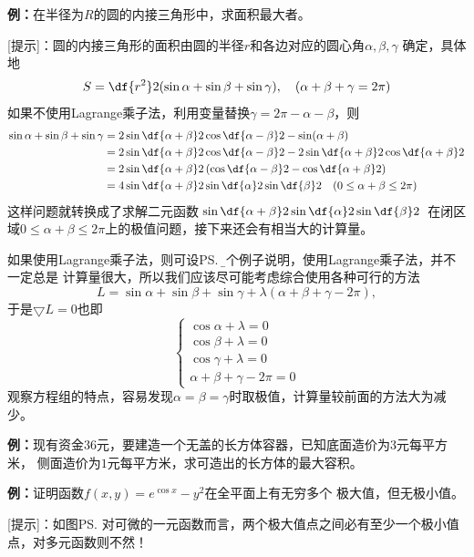 {\bf 例：}在半径为$R$的圆的内接三角形中，求面积最大者。

[提示]：圆的内接三角形的面积由圆的半径$r$和各边对应的圆心角$\alpha,\beta,\gamma$
确定，具体地
$$S=\df{r^2}2(\sin\alpha+\sin\beta+\sin\gamma),\quad
(\alpha+\beta+\gamma=2\pi)$$
如果不使用Lagrange乘子法，利用变量替换$\gamma=2\pi-\alpha-\beta$，则
\begin{align*}
	\sin\alpha+\sin\beta+\sin\gamma
	&=2\sin\df{\alpha+\beta}2\cos\df{\alpha-\beta}2-\sin(\alpha+\beta)\\
	&=2\sin\df{\alpha+\beta}2\cos\df{\alpha-\beta}2-2\sin\df{\alpha+\beta}2
	\cos\df{\alpha+\beta}2\\
	&=2\sin\df{\alpha+\beta}2\left(\cos\df{\alpha-\beta}2
	-\cos\df{\alpha+\beta}2\right)\\
	&=4\sin\df{\alpha+\beta}2\sin\df{\alpha}2\sin\df{\beta}2
	\quad(0\leq\alpha+\beta\leq2\pi)
\end{align*}
这样问题就转换成了求解二元函数$\sin\df{\alpha+\beta}2\sin\df{\alpha}2\sin\df{\beta}2$
在闭区域$0\leq\alpha+\beta\leq2\pi$上的极值问题，接下来还会有相当大的计算量。

如果使用Lagrange乘子法，则可设\ps{\b 这个例子说明，使用Lagrange乘子法，并不一定总是
计算量很大，所以我们应该尽可能考虑综合使用各种可行的方法}
$$L=\sin\alpha+\sin\beta+\sin\gamma+\lambda(\alpha+\beta+\gamma-2\pi),$$
于是$\bigtriangledown L=0$也即
$$
	\left\{\begin{array}{l}
		\cos\alpha+\lambda=0\\
		\cos\beta+\lambda=0\\
		\cos\gamma+\lambda=0\\
		\alpha+\beta+\gamma-2\pi=0
	\end{array}\right.
$$
观察方程组的特点，容易发现$\alpha=\beta=\gamma$时取极值，计算量较前面的方法大为减少。

{\bf 例：}现有资金$36$元，要建造一个无盖的长方体容器，已知底面造价为$3$元每平方米，
侧面造价为$1$元每平方米，求可造出的长方体的最大容积。
		
{\bf 例：}证明函数$f(x,y)=e^{\cos x}-y^2$在全平面上有无穷多个
极大值，但无极小值。

[提示]：如图\ps{对可微的一元函数而言，两个极大值点之间必有至少一个极小值点，对多元函数则不然！}
\begin{center}
\end{center}

